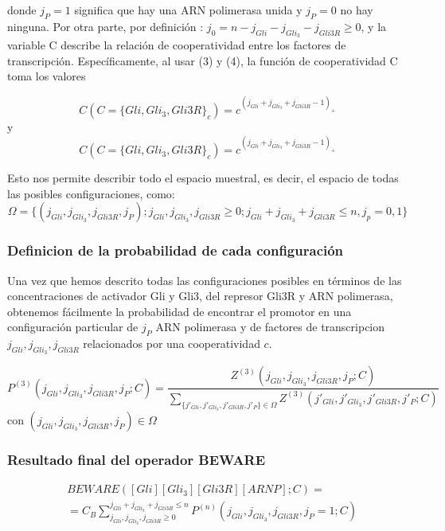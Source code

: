 donde $j_P = 1$ significa que hay una ARN polimerasa unida y $j_P = 0$ no hay ninguna. Por otra parte, por definición :
$j_0 = n - j_{Gli}- j_{Gli_3}- j_{Gli3R} \geq 0$, y la variable C describe la relación de cooperatividad entre los factores de transcripción. Específicamente, al usar (3) y (4), la función de cooperatividad C toma los valores

\begin{equation}
C(C=\{Gli,Gli_3,Gli3R\}_c)=c^{(j_{Gli}+ j_{Gli_3}+ j_{Gli3R}-1)_+}
\end{equation}
y
\begin{equation}
C(C=\{Gli,Gli_3,Gli3R\}_c)=c^{(j_{Gli}+ j_{Gli_3}+ j_{Gli3R}-1)_+}
\end{equation}

Esto nos permite describir todo el espacio muestral, es decir, el espacio de todas las posibles configuraciones, como:
\begin{equation}
\Omega=\{(j_{Gli}, j_{Gli_3}, j_{Gli3R},j_P);j_{Gli}, j_{Gli_3}, j_{Gli3R}\geq0;j_{Gli}+ j_{Gli_3}+ j_{Gli3R}\leq n,j_p=0,1\}
\end{equation}


\subsubsection{Definicion de la probabilidad de cada configuración}

Una vez que hemos descrito todas las configuraciones posibles en términos de las concentraciones de activador Gli y Gli3, del represor Gli3R y ARN polimerasa, obtenemos fácilmente la probabilidad de encontrar el promotor en una configuración particular de $j_P$ ARN polimerasa y de factores de transcripcion $j_{Gli}, j_{Gli_3}, j_{Gli3R}$ relacionados por una cooperatividad $c$.

\begin{equation}
P^{(3)}(j_{Gli}, j_{Gli_3}, j_{Gli3R},j_P;C)=\frac{Z^{(3)}(j_{Gli}, j_{Gli_3}, j_{Gli3R},j_P;C)}{\sum_{\{j'_{Gli}, j'_{Gli_3}, j'_{Gli3R},j'_P\}\in\Omega}Z^{(3)}(j'_{Gli}, j'_{Gli_3}, j'_{Gli3R},j'_P;C)}
\label{probabilidad}
\end{equation}
 con $(j_{Gli}, j_{Gli_3}, j_{Gli3R},j_P)\in\Omega$
\subsubsection{Resultado final del operador BEWARE}

\begin{equation}
\begin{split}
&BEWARE([Gli][Gli_3][Gli3R][ARNP];C)=\\&=C_B\sum_{j_{Gli}, j_{Gli_3}, j_{Gli3R}\geq0}^{j_{Gli}+ j_{Gli_3}+ j_{Gli3R}\leq n}P^{(n)}(j_{Gli}, j_{Gli_3}, j_{Gli3R},j_P=1;C)
\end{split}
\end{equation}

